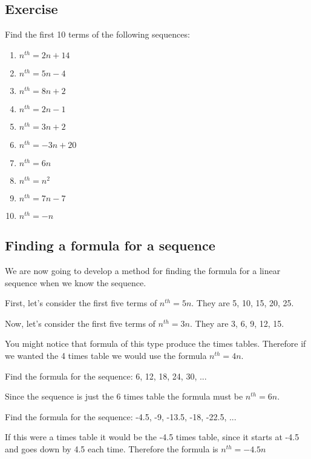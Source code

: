 \subsection{Exercise}
Find the first 10 terms of the following sequences:
\begin{enumerate}
	\item $n^{th}=2n+14$
	\item $n^{th}=5n-4$
	\item $n^{th}=8n+2$
	\item $n^{th}=2n-1$
	\item $n^{th}=3n+2$
	\item $n^{th}=-3n+20$
	\item $n^{th}=6n$
	\item $n^{th}=n^2$
	\item $n^{th}=7n-7$
	\item $n^{th}=-n$
\end{enumerate}

\subsection{Finding a formula for a sequence}
We are now going to develop a method for finding the formula for a linear sequence when we know the sequence.

First, let's consider the first five terms of $n^{th}=5n$.  They are 5, 10, 15, 20, 25.

Now, let's consider the first five terms of $n^{th}=3n$.  They are 3, 6, 9, 12, 15.

You might notice that formula of this type produce the times tables.  Therefore if we wanted the 4 times table we would use the formula $n^{th}=4n$.


\begin{exmp}
Find the formula for the sequence: 6, 12, 18, 24, 30, ...

\bigskip

Since the sequence is just the 6 times table the formula must be $n^{th}=6n$.
\end{exmp}

\begin{exmp}
Find the formula for the sequence: -4.5, -9, -13.5, -18, -22.5, ...

\bigskip

If this were a times table it would be the -4.5 times table, since it starts at -4.5 and goes down by 4.5 each time.  Therefore the formula is $n^{th}=-4.5n$
\end{exmp}


